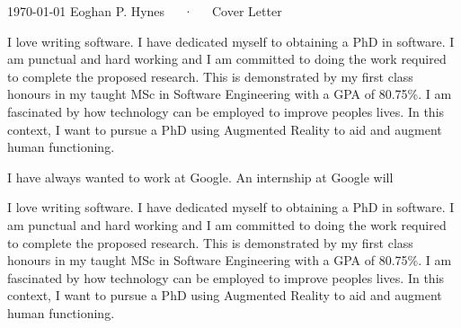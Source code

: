 \documentclass[11pt, a4paper]{awesome-cv}
\begin{document}
\makecvheader[R]

\makecvfooter
  {\today}
  {Eoghan P. Hynes~~~·~~~Cover Letter}
  {}

\makelettertitle

\begin{cvletter}

I love writing software. I have dedicated myself to obtaining a PhD in software. I am punctual and hard working and I am committed to doing the work required to complete the proposed research. This is demonstrated by my first class honours in my taught MSc in Software Engineering with a GPA of 80.75\%. I am fascinated by how technology can be employed to improve peoples lives. In this context, I want to pursue a PhD using Augmented Reality to aid and augment human functioning.

I have always wanted to work at Google. An internship at Google will 

I love writing software. I have dedicated myself to obtaining a PhD in software. I am punctual and hard working and I am committed to doing the work required to complete the proposed research. This is demonstrated by my first class honours in my taught MSc in Software Engineering with a GPA of 80.75\%. I am fascinated by how technology can be employed to improve peoples lives. In this context, I want to pursue a PhD using Augmented Reality to aid and augment human functioning.

\end{cvletter}


\makeletterclosing
\end{document}
